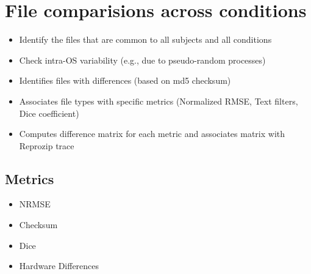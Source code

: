 \section{File comparisions across conditions}
\begin{itemize}
 \item Identify the files that are common to all subjects and all conditions
 \item Check intra-OS variability (e.g., due to pseudo-random processes)
 \item Identifies files with differences (based on md5 checksum)
 \item Associates file types with specific metrics (Normalized RMSE, Text filters, Dice coefficient)
 \item Computes difference matrix for each metric and associates matrix with Reprozip trace
\end{itemize}

\subsection{Metrics}
\begin{itemize}
\item NRMSE
\item Checksum
\item Dice
\item Hardware Differences
\end{itemize}
